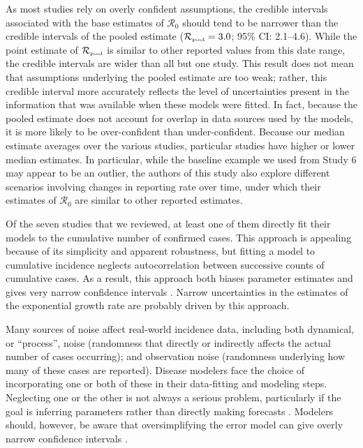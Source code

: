 \documentclass[12pt]{article}
\newcommand{\Ro}{\ensuremath{{\mathcal R}_{0}}\xspace}
\newcommand{\Rpool}{\ensuremath{{\mathcal R}_{\textrm{\tiny{pool}}}}\xspace}
\begin{document}
As most studies rely on overly confident assumptions, the credible intervals associated with the base estimates of \Ro should tend to be narrower than the credible intervals of the pooled estimate ($\Rpool = 3.0$; 95\% CI: 2.1--4.6).
While the point estimate of \Rpool is similar to other reported values from this date range, the credible intervals are wider than all but one study.
This result does not mean that assumptions underlying the pooled estimate are too weak;
rather, this credible interval more accurately reflects the level of uncertainties present in the information that was available when these models were fitted.
In fact, because the pooled estimate does not account for overlap in data sources used by the models, it is more likely to be over-confident than under-confident.
Because our median estimate averages over the various studies, particular studies have higher or lower median estimates.
In particular, while the baseline example we used from Study 6 may appear to be an outlier, the authors of this study also explore different scenarios involving changes in reporting rate over time, under which their estimates of \Ro are similar to other reported estimates.

Of the seven studies that we reviewed, at least one of them directly fit their models to the cumulative number of confirmed cases.
This approach is appealing because of its simplicity and apparent robustness, but fitting a model to cumulative incidence neglects autocorrelation between successive counts of cumulative cases. 
As a result, this approach both biases parameter estimates and gives very narrow confidence intervals \citep{ma2014estimating, king2015avoidable}.
Narrow uncertainties in the estimates of the exponential growth rate are probably driven by this approach.

Many sources of noise affect real-world incidence data, including both dynamical, or ``process'', noise (randomness that directly or indirectly affects the actual number of cases occurring); and observation noise (randomness underlying how many of these cases are reported).  
Disease modelers face the choice of incorporating one or both of these in their data-fitting and modeling steps. 
Neglecting one or the other is not always a serious problem, particularly if the goal is inferring parameters rather than directly making forecasts \citep{ma2014estimating}.
Modelers should, however, be aware that oversimplifying the error model can give overly narrow confidence intervals \citep{king2015avoidable,taylor2016stochasticity}.
\end{document}

